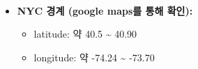 \documentclass[11pt]{article}
\providecommand{\tightlist}{%
      \setlength{\itemsep}{0pt}\setlength{\parskip}{0pt}}
\begin{document}
    \begin{center}
    \end{center}
    { \hspace*{\fill} \\}
    
    \begin{itemize}
\tightlist
\item
  \textbf{NYC 경계 (google maps를 통해 확인):}

  \begin{itemize}
  \tightlist
  \item
    latitude: 약 40.5 \textasciitilde{} 40.90
  \item
    longitude: 약 -74.24 \textasciitilde{} -73.70
  \end{itemize}
\end{itemize}
\end{document}
